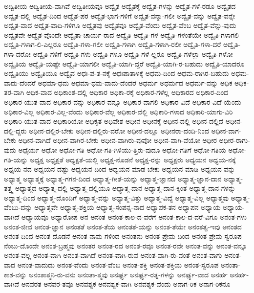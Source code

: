 {ಅದ್ವಿತೀಯ
ಅದ್ವಿತೀಯ-ವಾಗಿವೆ
ಅದ್ವಿತೀಯವೂ
ಅದ್ವೈತ
ಅದ್ವೈತಕ್ಕೆ
ಅದ್ವೈತ-ಗಳನ್ನು
ಅದ್ವೈತ-ಗಳೆ-ರಡೂ
ಅದ್ವೈತದ
ಅದ್ವೈತ-ದಲ್ಲಿ
ಅದ್ವೈತ-ದಿಂದ
ಅದ್ವೈತ-ಪರ
ಅದ್ವೈತ-ಭಾಗ-ಗಳಿಗೆ
ಅದ್ವೈತ-ವನ್ನಾ-ಗಲೀ
ಅದ್ವೈತ-ವನ್ನು
ಅದ್ವೈತ-ವನ್ನೇ
ಅದ್ವೈತ-ವಾದ
ಅದ್ವೈತ-ವಾದಿ-ಗಳಿಗೂ
ಅದ್ವೈತವು
ಅದ್ವೈತವೂ
ಅದ್ವೈತ-ವೆಂದು
ಅದ್ವೈತ-ವೆಂಬ
ಅದ್ವೈತ-ವೆನ್ನು-ವುದು
ಅದ್ವೈತವೇ
ಅದ್ವೈತ-ವೊಂದೇ
ಅದ್ವೈತಾ-ಚಾರ್ಯ-ರಾದ
ಅದ್ವೈತಿ
ಅದ್ವೈತಿ-ಗಳ
ಅದ್ವೈತಿ-ಗಳಂತೆಯೇ
ಅದ್ವೈತಿ-ಗಳಾಗಲಿ
ಅದ್ವೈತಿ-ಗಳಾಗ-ಲಿ-ಎಲ್ಲರೂ
ಅದ್ವೈತಿ-ಗಳಾ-ಗಲೀ
ಅದ್ವೈತಿ-ಗಳಾಗಿ
ಅದ್ವೈತಿ-ಗಳಾಗಿ-ರಲೀ
ಅದ್ವೈತಿ-ಗಳಾ-ದರೆ
ಅದ್ವೈತಿ-ಗಳಾ-ದರೋ
ಅದ್ವೈತಿ-ಗಳಿಗೆ
ಅದ್ವೈತಿ-ಗಳು
ಅದ್ವೈತಿ-ಗಳೂ
ಅದ್ವೈತಿ-ಗಳೆ-ಲ್ಲರೂ
ಅದ್ವೈತಿ-ಗಳೆಲ್ಲಾ
ಅದ್ವೈತಿ-ಗಳೋ
ಅದ್ವೈತಿಯ
ಅದ್ವೈತಿ-ಯಷ್ಟೇ
ಅದ್ವೈತಿ-ಯಾಗಲೀ
ಅದ್ವೈತಿ-ಯಾಗಿ-ದ್ದರೆ
ಅದ್ವೈತಿ-ಯಾಗಿ-ರ-ಬಹುದು
ಅದ್ವೈತಿ-ಯಾದರೂ
ಅದ್ವೈತಿಯು
ಅದ್ವೈತಿಯೂ
ಅದ್ವೈವ
ಅಧಃ-ಪ-ತ-ನಕ್ಕೆ
ಅಧಃಪಾತಾಳಕ್ಕೆ
ಅಧಮ-ದಿಂದ
ಅಧಮ-ರಾಗಿರ-ಬಹುದು
ಅಧಮ-ವಾದು-ದೆಂದರೆ
ಅಧಮಾ-ಧಮ
ಅಧಮಾ-ಧಮ-ವಾದು-ದೆಂದರೆ
ಅಧರ್ಮ
ಅಧರ್ಮದ
ಅಧರ್ಮ-ವನ್ನು
ಅಧಿಕ
ಅಧಿಕ-ತರ-ವಾಗಿ
ಅಧಿಕ-ವಾದ
ಅಧಿಕಾಂಶ-ದಲ್ಲಿ
ಅಧಿಕಾರ
ಅಧಿಕಾ-ರಕ್ಕೆ
ಅಧಿಕಾರ-ಗಳೆಲ್ಲ
ಅಧಿಕಾರದ
ಅಧಿಕಾರ-ದಿಂದ
ಅಧಿಕಾರ-ಯುತ-ವಾದ
ಅಧಿಕಾರ-ವನ್ನು
ಅಧಿಕಾರ-ವನ್ನೂ
ಅಧಿಕಾರ-ವಾಗಲಿ
ಅಧಿಕಾರ-ವಿದೆ
ಅಧಿಕಾರ-ವಿದೆ-ಯೆಂದು
ಅಧಿಕಾರ-ವಿಲ್ಲ
ಅಧಿಕಾರ-ವಿಲ್ಲ-ವೆಂದು
ಅಧಿಕಾರ-ವೆಲ್ಲ
ಅಧಿಕಾರ-ವೆಲ್ಲಿ
ಅಧಿಕಾರಿ-ಗಳಾದ
ಅಧಿಕಾರಿ-ಯಾಗು-ವಿರಿ
ಅಧಿಕಾರಿ-ಯುತ-ವಾದ
ಅಧಿಕಾರಿಯೋ
ಅಧಿಕೃತ
ಅಧಿವೇಶ
ಅಧೀನ
ಅಧೀನಕ್ಕೆ
ಅಧೀನ-ದಲ್ಲಿ
ಅಧೀನ-ದಲ್ಲಿದೆ
ಅಧೀನ-ದಲ್ಲಿ-ದ್ದರು
ಅಧೀನ-ದಲ್ಲಿರ-ಬೇಕು
ಅಧೀನ-ದಲ್ಲಿರು-ವರೋ
ಅಧೀನ-ದಲ್ಲೂ
ಅಧೀನರಾ-ದಂದಿ-ನಿಂದ
ಅಧೀನ-ವಾಗ-ಬೇಕು
ಅಧೀನ-ವಾಗಿದೆ
ಅಧೀನ-ವಾಗಿರ-ಬೇಕು
ಅಧೀನ-ವಾಗಿರು-ವುವೋ
ಅಧೀನ-ವಾಗಿ-ವೆಯೋ
ಅಧೀರ
ಅಧೀರ-ರಾಗು-ವುದು
ಅಧೈರ್ಯ
ಅಧೋ
ಅಧೋ-ಗತಿ
ಅಧೋ-ಗತಿ-ಗಿಳಿಯು-ತ್ತಿರು-ವುದೂ
ಅಧೋ-ಗತಿಗೆ
ಅಧೋ-ಗತಿಯ
ಅಧೋ-ಗತಿ-ಯನ್ನು
ಅಧ್ಯಕ್ಷ
ಅಧ್ಯಕ್ಷತೆ
ಅಧ್ಯಕ್ಷತೆ-ಯಲ್ಲಿ
ಅಧ್ಯಕ್ಷ-ನೊಡನೆ
ಅಧ್ಯಕ್ಷ-ರನ್ನು
ಅಧ್ಯಕ್ಷರು
ಅಧ್ಯಯನ
ಅಧ್ಯಯ-ನಕ್ಕೆ
ಅಧ್ಯಯ-ನದ
ಅಧ್ಯಯನ-ದಷ್ಟು
ಅಧ್ಯಯನ-ದಿಂದ
ಅಧ್ಯಯನ-ಮಾಡ-ಬೇಕು
ಅಧ್ಯಯನ-ಮಾಡಿ
ಅಧ್ಯಯನ-ವನ್ನು
ಅಧ್ಯಾತ್ಮ
ಅಧ್ಯಾತ್ಮಕ್ಕೆ
ಅಧ್ಯಾತ್ಮ-ಗಗನ-ದಿಂದ
ಅಧ್ಯಾತ್ಮ-ಗೀತೆ-ಯನ್ನು
ಅಧ್ಯಾತ್ಮ-ಜ್ಞಾನದ
ಅಧ್ಯಾತ್ಮ-ಜ್ಞಾನ-ದಾನ
ಅಧ್ಯಾತ್ಮ-ತತ್ತ್ವ
ಅಧ್ಯಾತ್ಮದ
ಅಧ್ಯಾತ್ಮ-ದಲ್ಲಿ
ಅಧ್ಯಾತ್ಮ-ದಲ್ಲಿಯೂ
ಅಧ್ಯಾತ್ಮ-ದಾನ
ಅಧ್ಯಾತ್ಮ-ದಾನ-ಕ್ಕಿಂತ
ಅಧ್ಯಾತ್ಮ-ದಾನ-ಗಳನ್ನು
ಅಧ್ಯಾತ್ಮ-ದಿಂದ
ಅಧ್ಯಾತ್ಮ-ದೊಂದಿಗೆ
ಅಧ್ಯಾತ್ಮ-ವನ್ನು
ಅಧ್ಯಾತ್ಮ-ವಿತ್ತು
ಅಧ್ಯಾತ್ಮ-ವಿದ್ಯೆ
ಅಧ್ಯಾತ್ಮ-ವಿಲ್ಲ
ಅಧ್ಯಾತ್ಮವು
ಅಧ್ಯಾತ್ಮ-ವೆಂಬು-ದನ್ನು
ಅಧ್ಯಾತ್ಮವೇ
ಅಧ್ಯಾತ್ಮ-ಶಕ್ತಿಯ
ಅಧ್ಯಾತ್ಮ-ಸಂಪನ್ನ-ನಾದ
ಅಧ್ಯಾಪಕ-ತನ
ಅಧ್ಯಾಪನ
ಅಧ್ಯಾಯ
ಅಧ್ಯಾಯ-ವಾಗಿದೆ
ಅಧ್ಯಾಯವೂ
ಅಧ್ಯಾರೋಪ
ಅನ
ಅನಂತ
ಅನಂತ-ಕಾಲ-ದ-ವರೆಗೆ
ಅನಂತ-ಕಾಲ-ದ-ವರೆ-ವಿಗೂ
ಅನಂತ-ಗಳು
ಅನಂತ-ಜೀವ
ಅನಂತ-ಜ್ಞಾನ
ಅನಂತತೆ
ಅನಂತ-ತೆಯ
ಅನಂತತೆ-ಯನ್ನು
ಅನಂತ-ತೆಯೇ
ಅನಂತತ್ವ-ಇವು
ಅನಂತದ
ಅನಂತ-ದಿಂದ
ಅನಂತ-ದೊಡನೆ
ಅನಂತ-ನಾಮ-ಗಳಿಂದ
ಅನಂತನು
ಅನಂತ-ಪ್ರೇಮ-ದಿಂದ
ಅನಂತ-ಪ್ರೇಮ-ಸ್ವರೂಪ-ನೆಂಬು-ದೊಂದೇ
ಅನಂತ-ಬ್ರಹ್ಮವು
ಅನಂತರ
ಅನಂತ-ರದ
ಅನಂತ-ರವೂ
ಅನಂತ-ರವೇ
ಅನಂತ-ವನ್ನು
ಅನಂತ-ವನ್ನೂ
ಅನಂತ-ವಲ್ಲ
ಅನಂತ-ವಾಗಿ
ಅನಂತ-ವಾಗಿದೆ
ಅನಂತ-ವಾಗಿ-ರುವ
ಅನಂತ-ವಾಗಿ-ರು-ವಂತೆ
ಅನಂತ-ವಾಗು
ಅನಂತ-ವಾದ
ಅನಂತ-ವಾದುದು
ಅನಂತ-ವೆಂದು
ಅನಂತ-ವೆಂಬ
ಅನಂತ-ಶಕ್ತಿ
ಅನಂತ-ಶಕ್ತಿಯ
ಅನಂತ-ಸ್ವರೂಪ
ಅನಂತಾ-ಕಾಶ-ವನ್ನು
ಅನಂತಾತ್ಮನಿ-ರು-ವನು
ಅನಂತಾ-ತ್ಮವು
ಅನರ್ಘ್ಯ
ಅನರ್ಘ್ಯ-ರತ್ನ-ಗಳನ್ನು
ಅನರ್ಘ್ಯ-ವಾದ
ಅನರ್ಹ
ಅನರ್ಹ-ವಾಗಿವೆ
ಅನವರತ
ಅನವರ-ತವೂ
ಅನವಶ್ಯಕ
ಅನವಶ್ಯಕ-ವಾಗಿ
ಅನವಶ್ಯಕ-ವೆಂದು
ಅನಾಗ-ರಿಕ
ಅನಾಗ-ರಿಕನೂ
}
